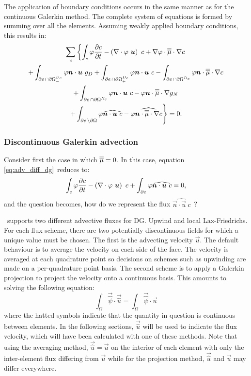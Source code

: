 The application of boundary conditions occurs in the same manner as for the
continuous Galerkin method. The complete system of equations is formed
by summing over all the elements. Assuming weakly applied boundary
conditions, this results in:
\begin{multline}
  \sum_e \left\{ \int_e \varphi \frac{\partial c}{\partial t}
  - \left(\nabla\cdot \varphi~{\mbox{\boldmath$u$}}\right)~c
  + \nabla\varphi\cdot\overline{\overline{\mu}}\cdot\nabla c \right. \\
  \left. + \int_{\partial e\,\cap{\partial\Omega}^{D_c}_{-}} \varphi{\mbox{\boldmath$n$}}\cdot{\mbox{\boldmath$u$}}~g_D
  + \int_{\partial e\,\cap{\partial\Omega}^{D_c}_{+}} \varphi{\mbox{\boldmath$n$}}\cdot{\mbox{\boldmath$u$}}~c
  - \int_{\partial e\,\cap{\partial\Omega}^{D_c}}
  \varphi{\mbox{\boldmath$n$}}\cdot\overline{\overline{\mu}}\cdot\nabla c \right. \\
  \left. + \int_{\partial e\,\cap{\partial\Omega}^{N_c}} \varphi{\mbox{\boldmath$n$}}\cdot{\mbox{\boldmath$u$}}~c
  - \varphi{\mbox{\boldmath$n$}}\cdot\overline{\overline{\mu}}\cdot\nabla g_N \right. \\
  \left. + \int_{\partial e\,\setminus{\partial\Omega}} \varphi\widehat{{\mbox{\boldmath$n$}}\cdot{\mbox{\boldmath$u$}}~c}
  - \varphi\widehat{{\mbox{\boldmath$n$}}\cdot\overline{\overline{\mu}}\cdot\nabla c} \right\}
    = 0.
\end{multline}

\subsubsection{Discontinuous Galerkin advection}
\label{Sect:ND_discontinuous_galerkin_advection}

Consider first the case in which $\overline{\overline{\mu}}=0$. In this case, equation
\eqref{eq:adv_diff_dg}\ reduces to:
\begin{equation}\label{eq:adv_dg}
  \int_e \varphi \frac{\partial c}{\partial t} -
    \left(\nabla\cdot \varphi~{\mbox{\boldmath$u$}}\right)~c +
    \int_{\partial e} \varphi\widehat{{\mbox{\boldmath$n$}}\cdot{\mbox{\boldmath$u$}}~c}
    = 0,
\end{equation}
and the question becomes, how do we represent the flux
$\widehat{\vec{n}\cdot\vec{u}~c}$\ ?

\fluidity\ supports two different advective fluxes for DG. Upwind and local
Lax-Friedrichs. For each flux scheme, there are two potentially
discontinuous fields for which a unique value must be chosen. The first is
the advecting velocity $\vec{u}$. The default behaviour is to average the
velocity on each side of the face. The velocity is averaged at each
quadrature point so decisions on schemes such as upwinding are made on a
per-quadrature point basis. The second scheme is to apply a Galerkin
projection to project the velocity onto a continuous basis. This amounts to
solving the following equation:
\begin{equation}
  \int_\Omega \vec{\hat{\psi}} \cdot\vec{\hat{u}}
  = \int_\Omega \vec{\hat{\psi}}\cdot \vec{u}
\end{equation}
where the hatted symbols indicate that the quantity in question is
continuous between elements. In the following sections, $\vec{\hat{u}}$ will
be used to indicate the flux velocity, which will have been calculated with
one of these methods. Note that using the averaging method,
$\vec{\hat{u}}=\vec{u}$ on the interior of each element with only the inter-element
flux differing from $\vec{u}$ while for the projection method, $\vec{\hat
  u}$ and $\vec{u}$ may differ everywhere.

